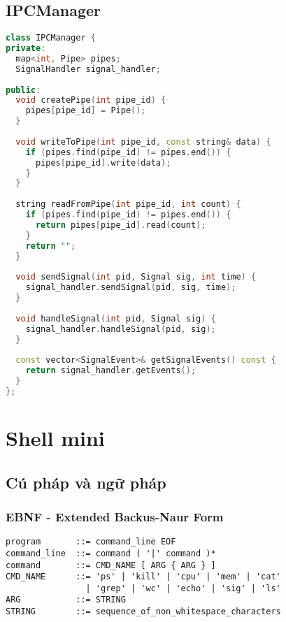 \subsection{IPCManager}

\begin{lstlisting}[language=C++,caption={IPC Manager}]
class IPCManager {
private:
  map<int, Pipe> pipes;
  SignalHandler signal_handler;
  
public:
  void createPipe(int pipe_id) {
    pipes[pipe_id] = Pipe();
  }
  
  void writeToPipe(int pipe_id, const string& data) {
    if (pipes.find(pipe_id) != pipes.end()) {
      pipes[pipe_id].write(data);
    }
  }
  
  string readFromPipe(int pipe_id, int count) {
    if (pipes.find(pipe_id) != pipes.end()) {
      return pipes[pipe_id].read(count);
    }
    return "";
  }
  
  void sendSignal(int pid, Signal sig, int time) {
    signal_handler.sendSignal(pid, sig, time);
  }
  
  void handleSignal(int pid, Signal sig) {
    signal_handler.handleSignal(pid, sig);
  }
  
  const vector<SignalEvent>& getSignalEvents() const {
    return signal_handler.getEvents();
  }
};
\end{lstlisting}

\section{Shell mini}

\subsection{Cú pháp và ngữ pháp}

\subsubsection{EBNF - Extended Backus-Naur Form}

\begin{lstlisting}[caption={EBNF của Shell mini}]
program       ::= command_line EOF
command_line  ::= command ( '|' command )*
command       ::= CMD_NAME [ ARG { ARG } ]
CMD_NAME      ::= 'ps' | 'kill' | 'cpu' | 'mem' | 'cat' 
                | 'grep' | 'wc' | 'echo' | 'sig' | 'ls'
ARG           ::= STRING
STRING        ::= sequence_of_non_whitespace_characters
\end{lstlisting}

